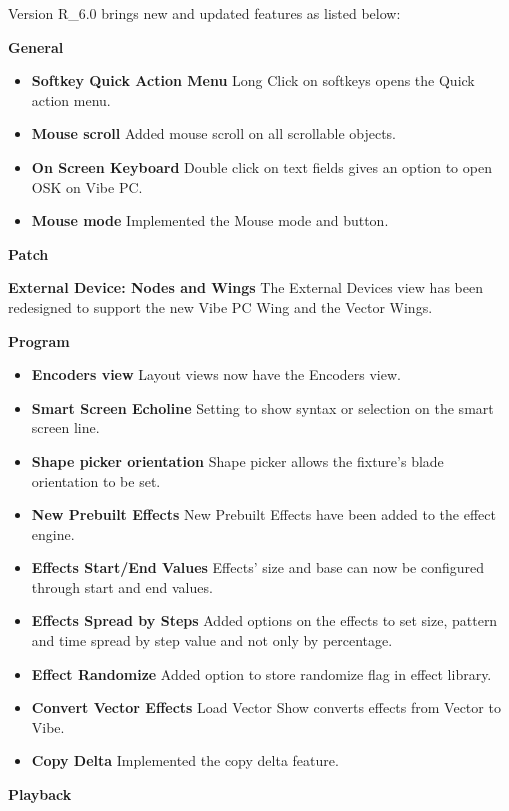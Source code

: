 \documentclass[
]{article}
\begin{document}
Version R\_6.0 brings new and updated features as listed below:

\textbf{General}

\begin{itemize}
\item
  \textbf{Softkey Quick Action Menu} Long Click on softkeys opens the Quick action menu.
\item
  \textbf{Mouse scroll} Added mouse scroll on all scrollable objects.
\item
  \textbf{On Screen Keyboard} Double click on text fields gives an option to open OSK on Vibe PC.
\item
  \textbf{Mouse mode} Implemented the Mouse mode and button.
\end{itemize}

\textbf{Patch}

\textbf{External Device: Nodes and Wings} The External Devices view has been redesigned to support the new Vibe PC Wing and the Vector Wings.

\textbf{Program}

\begin{itemize}
\item
  \textbf{Encoders view} Layout views now have the Encoders view.
\item
  \textbf{Smart Screen Echoline} Setting to show syntax or selection on the smart screen line.
\item
  \textbf{Shape picker orientation} Shape picker allows the fixture's blade orientation to be set.
\item
  \textbf{New Prebuilt Effects} New Prebuilt Effects have been added to the effect engine.
\item
  \textbf{Effects Start/End Values} Effects' size and base can now be configured through start and end values.
\item
  \textbf{Effects Spread by Steps} Added options on the effects to set size, pattern and time spread by step value and not only by percentage.
\item
  \textbf{Effect Randomize} Added option to store randomize flag in effect library.
\item
  \textbf{Convert Vector Effects} Load Vector Show converts effects from Vector to Vibe.
\item
  \textbf{Copy Delta} Implemented the copy delta feature.
\end{itemize}

\textbf{Playback}
\end{document}
